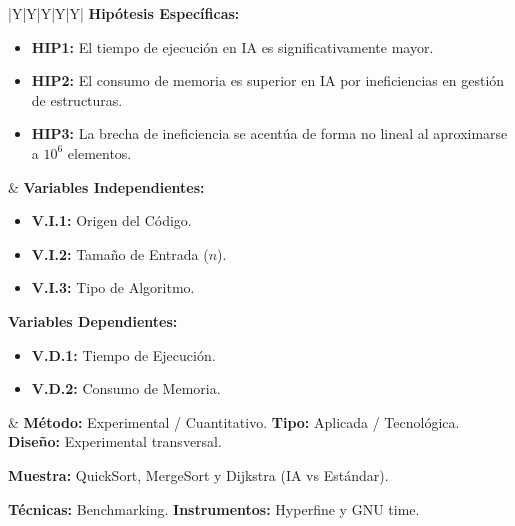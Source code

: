\documentclass[14pt,a4paper]{extarticle} %
\begin{document}
\begin{landscape}
\begin{tabularx}{\linewidth}{|Y|Y|Y|Y|Y|}
\textbf{Hipótesis Específicas:}
\begin{itemize}[leftmargin=*, nosep, itemsep=6pt]
    \item \textbf{HIP1:} El tiempo de ejecución en IA es significativamente mayor.
    \item \textbf{HIP2:} El consumo de memoria es superior en IA por ineficiencias en gestión de estructuras.
    \item \textbf{HIP3:} La brecha de ineficiencia se acentúa de forma no lineal al aproximarse a $10^6$ elementos.
\end{itemize} 
& 
\textbf{Variables Independientes:}
\begin{itemize}[leftmargin=*, nosep, itemsep=2pt]
    \item \textbf{V.I.1:} Origen del Código.
    \item \textbf{V.I.2:} Tamaño de Entrada ($n$).
    \item \textbf{V.I.3:} Tipo de Algoritmo.
\end{itemize}

\textbf{Variables Dependientes:}
\begin{itemize}[leftmargin=*, nosep, itemsep=2pt]
    \item \textbf{V.D.1:} Tiempo de Ejecución.
    \item \textbf{V.D.2:} Consumo de Memoria.
\end{itemize} 
& 
\textbf{Método:} Experimental / Cuantitativo. \newline
\textbf{Tipo:} Aplicada / Tecnológica. \newline
\textbf{Diseño:} Experimental transversal. \newline

\textbf{Muestra:} \newline
QuickSort, MergeSort y Dijkstra (IA vs Estándar). \newline

\textbf{Técnicas:} Benchmarking. \newline
\textbf{Instrumentos:} Hyperfine y GNU time. \\ \hline
\end{tabularx}

\end{landscape}
\end{document}
